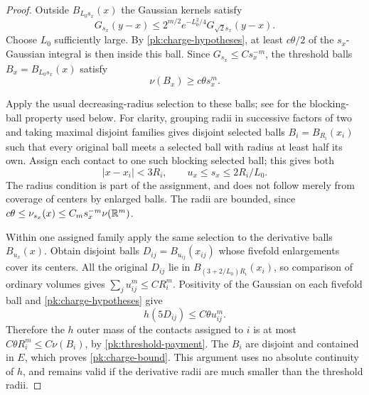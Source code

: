 \begin{proof}
Outside $B_{L_0s_x}(x)$ the Gaussian kernels satisfy
\[
 G_{s_x}(y-x)\le 2^{m/2}e^{-L_0^2/4}
                         G_{\sqrt2s_x}(y-x).
\]
Choose $L_0$ sufficiently large.  By
\eqref{pk:charge-hypotheses}, at least $c\theta/2$ of the
$s_x$-Gaussian integral is then inside this ball.  Since
$G_{s_x}\le Cs_x^{-m}$, the threshold balls
$B_x=B_{L_0s_x}(x)$ satisfy
\begin{equation}\label{pk:threshold-payment}
 \nu(B_x)\ge c\theta s_x^m.
\end{equation}

Apply the usual decreasing-radius selection to these balls; see
\cite[Chapter~1, Lemma~3.4]{Simon2018} for the blocking-ball property
used below.
For clarity, grouping radii in successive factors of two and
taking maximal disjoint families gives disjoint selected
balls $B_i=B_{R_i}(x_i)$ such that every original ball meets
a selected ball with radius at least half its own.  Assign
each contact to one such blocking selected ball; this gives
both
\[
 |x-x_i|<3R_i,\qquad u_x\le s_x\le2R_i/L_0.
\]
The radius condition is part of the assignment, and does not
follow merely from coverage of centers by enlarged balls.
The radii are bounded, since
$c\theta\le\nu_{s_x}(x)\le C_m s_x^{-m}\nu(\mathbb R^m)$.

Within one assigned family apply the same selection to the
derivative balls $B_{u_x}(x)$.  Obtain disjoint balls
$D_{ij}=B_{u_{ij}}(x_{ij})$ whose fivefold enlargements cover
its centers.  All the original $D_{ij}$ lie in
$B_{(3+2/L_0)R_i}(x_i)$, so comparison of ordinary volumes
gives $\sum_j u_{ij}^m\le C R_i^m$.  Positivity of the
Gaussian on each fivefold ball and
\eqref{pk:charge-hypotheses} give
\[
 h(5D_{ij})\le C\theta u_{ij}^m.
\]
Therefore the $h$ outer mass of the contacts assigned to $i$
is at most
$C\theta R_i^m\le C\nu(B_i)$, by
\eqref{pk:threshold-payment}.  The $B_i$ are disjoint and
contained in $E$, which proves \eqref{pk:charge-bound}.
This argument uses no absolute continuity of $h$, and remains
valid if the derivative radii are much smaller than the
threshold radii.
\end{proof}

